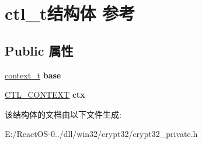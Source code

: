 \hypertarget{structctl__t}{}\section{ctl\+\_\+t结构体 参考}
\label{structctl__t}
\subsection*{Public 属性}
\begin{DoxyCompactItemize}
\item 
\mbox{\label{structctl__t_a32940d1b9477bde2c83aa169f1880d06}} 
\hyperlink{struct__context__t}{context\+\_\+t} {\bfseries base}
\item 
\mbox{\label{structctl__t_a7986a611bba7f737318524ae76204d5d}} 
\hyperlink{struct___c_t_l___c_o_n_t_e_x_t}{C\+T\+L\+\_\+\+C\+O\+N\+T\+E\+XT} {\bfseries ctx}
\end{DoxyCompactItemize}


该结构体的文档由以下文件生成\+:\begin{DoxyCompactItemize}
\item 
E\+:/\+React\+O\+S-\/0../dll/win32/crypt32/crypt32\+\_\+private.\+h\end{DoxyCompactItemize}
